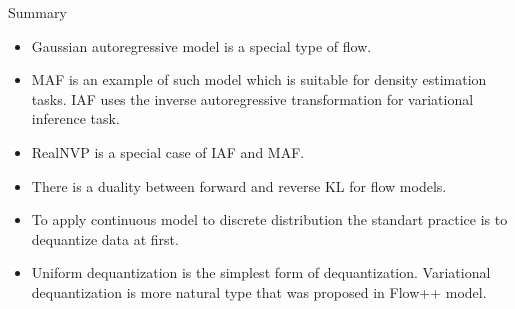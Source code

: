 \begin{frame}{Summary}
	\begin{itemize}
		\item Gaussian autoregressive model is a special type of flow.
		\vfill
		\item MAF is an example of such model which is suitable for density estimation tasks. IAF uses the inverse autoregressive transformation for variational inference task.
		\vfill
		\item RealNVP is a special case of IAF and MAF.
		\vfill
		\item There is a duality between forward and reverse KL for flow models.
		\vfill
		\item To apply continuous model to discrete distribution the standart practice is to dequantize data at first.
		\vfill
		\item Uniform dequantization is the simplest form of dequantization. Variational dequantization is more natural type that was proposed in Flow++ model.
	\end{itemize}
\end{frame}
 